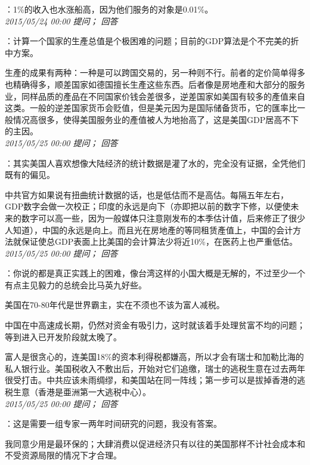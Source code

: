 \documentclass[twocolumn]{ctexart}
\begin{document}
：1\%的收入也水涨船高，因为他们服务的对象是0.01\%。\\

\textit{\hfill\noindent\small 2015/05/24 00:00 提问； 回答}

：计算一个国家的生產总值是个极困难的问题；目前的GDP算法是个不完美的折中方案。

生產的成果有两种：一种是可以跨国交易的，另一种则不行。前者的定价简单得多也精确得多，顺差国家如德国擅长生產这些东西。后者像是房地產和大部分的服务业，同样品质的產品在不同国家价钱会差很多，逆差国家如美国有较多的產值来自这类。一般的逆差国家货币会贬值，但是美元因为是国际储备货币，它的匯率比一般情况高很多，使得美国服务业的產值被人为地抬高了，这是美国GDP居高不下的主因。\\

\textit{\hfill\noindent\small 2015/05/25 00:00 提问； 回答}

：其实美国人喜欢想像大陆经济的统计数据是灌了水的，完全没有证据，全凭他们既有的偏见。

中共官方如果说有扭曲统计数据的话，也是低估而不是高估。每隔五年左右，GDP数字会做一次校正；印度的永远是向下（亦即把以前的数字下修，以便使未来的数字可以高一些，因为一般媒体只注意刚发布的本季估计值，后来修正了很少人知道），中国的永远是向上。而且光在房地產的等同租赁產值上，中国的会计方法就保证使总GDP表面上比美国的会计算法少将近10\%，在医药上也严重低估。\\

\textit{\hfill\noindent\small 2015/05/25 00:00 提问； 回答}

：你说的都是真正实践上的困难，像台湾这样的小国大概是无解的，不过至少一个有点主见毅力的总统会比马英九好些。

美国在70-80年代是世界霸主，实在不须也不该为富人减税。

中国在中高速成长期，仍然对资金有吸引力，这时就该着手处理贫富不均的问题；等到进入已开发阶段就太晚了。

富人是很贪心的，连美国18\%的资本利得税都嫌高，所以才会有瑞士和加勒比海的私人银行业。美国税收入不敷出后，开始对它们追缴，瑞士的逃税生意在过去两年很受打击。中共应该未雨绸缪，和美国站在同一阵线；第一步可以是拔掉香港的逃税生意（香港是亜洲第一大逃税中心）。\\

\textit{\hfill\noindent\small 2015/05/25 00:00 提问； 回答}

：这是需要一组专家一两年时间研究的问题，我没有答案。

我同意少用是最环保的；大肆消费以促进经济只有以往的美国那样不计社会成本和不受资源局限的情况下才合理。\\
\end{document}
